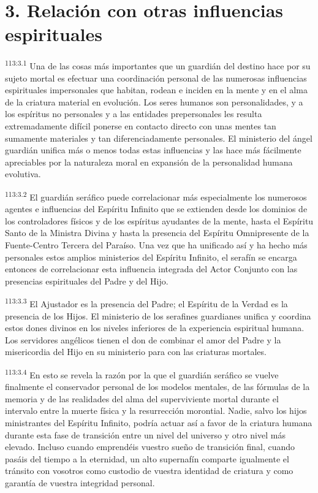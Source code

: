 \documentclass[twoside, 11pt]{book}
\begin{document}
\section*{3. Relación con otras influencias espirituales}
\par
\textsuperscript{113:3.1} Una de las cosas más importantes que un guardián del destino hace por su sujeto mortal es efectuar una coordinación personal de las numerosas influencias espirituales impersonales que habitan, rodean e inciden en la mente y en el alma de la criatura material en evolución. Los seres humanos son personalidades, y a los espíritus no personales y a las entidades prepersonales les resulta extremadamente difícil ponerse en contacto directo con unas mentes tan sumamente materiales y tan diferenciadamente personales. El ministerio del ángel guardián unifica más o menos todas estas influencias y las hace más fácilmente apreciables por la naturaleza moral en expansión de la personalidad humana evolutiva.

\par
\textsuperscript{113:3.2} El guardián seráfico puede correlacionar más especialmente los numerosos agentes e influencias del Espíritu Infinito que se extienden desde los dominios de los controladores físicos y de los espíritus ayudantes de la mente, hasta el Espíritu Santo de la Ministra Divina y hasta la presencia del Espíritu Omnipresente de la Fuente-Centro Tercera del Paraíso. Una vez que ha unificado así y ha hecho más personales estos amplios ministerios del Espíritu Infinito, el serafín se encarga entonces de correlacionar esta influencia integrada del Actor Conjunto con las presencias espirituales del Padre y del Hijo.

\par
\textsuperscript{113:3.3} El Ajustador es la presencia del Padre; el Espíritu de la Verdad es la presencia de los Hijos. El ministerio de los serafines guardianes unifica y coordina estos dones divinos en los niveles inferiores de la experiencia espiritual humana. Los servidores angélicos tienen el don de combinar el amor del Padre y la misericordia del Hijo en su ministerio para con las criaturas mortales.

\par
\textsuperscript{113:3.4} En esto se revela la razón por la que el guardián seráfico se vuelve finalmente el conservador personal de los modelos mentales, de las fórmulas de la memoria y de las realidades del alma del superviviente mortal durante el intervalo entre la muerte física y la resurrección morontial. Nadie, salvo los hijos ministrantes del Espíritu Infinito, podría actuar así a favor de la criatura humana durante esta fase de transición entre un nivel del universo y otro nivel más elevado. Incluso cuando emprendéis vuestro sueño de transición final, cuando pasáis del tiempo a la eternidad, un alto supernafín comparte igualmente el tránsito con vosotros como custodio de vuestra identidad de criatura y como garantía de vuestra integridad personal.
\end{document}
